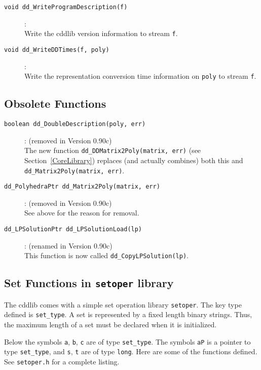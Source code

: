 \documentclass[11pt]{article}
\newcommand {\0} {{\bf 0}}
\begin{document}
\begin{description}
\item[{\tt void dd\_WriteProgramDescription(f)}]:\\
Write the cddlib version information to stream {\tt f}.

\item[{\tt void dd\_WriteDDTimes(f, poly)}]:\\
Write the representation conversion time information on {\tt poly}
 to stream {\tt f}.

\end{description}

\subsection{Obsolete Functions}  \label{ObsoleteFunctions}
\begin{description}
\item[{\tt boolean dd\_DoubleDescription(poly, err)}]:
(removed in Version 0.90c)\\
The new function
{\tt dd\_DDMatrix2Poly(matrix, err)} (see Section~\ref{CoreLibrary})
replaces (and actually combines) both this and
{\tt dd\_Matrix2Poly(matrix, err)}.

\item[{\tt dd\_PolyhedraPtr dd\_Matrix2Poly(matrix, err)}]:
(removed in Version 0.90c)\\
See above for the reason for removal.

\item[{\tt dd\_LPSolutionPtr dd\_LPSolutionLoad(lp)}]:
(renamed in Version 0.90c)\\
This function is now called {\tt dd\_CopyLPSolution(lp)}.

\end{description}


\subsection{Set Functions in {\tt setoper} library}  \label{SetFunctions}

The cddlib comes with a simple set operation library {\tt setoper}.  The key
type defined is {\tt set\_type}.   A set is represented by a fixed length
binary strings.  Thus, the maximum length of a set must be declared when
it is initialized.

Below the symbols {\tt a},   {\tt b},  {\tt c} are
of type  {\tt set\_type}.   The symbols {\tt aP} is a
pointer to type  {\tt set\_type}, and {\tt s}, {\tt t} are of type {\tt long}.
Here are some of the functions defined.  See {\tt setoper.h} for a
complete listing.
\end{document}

